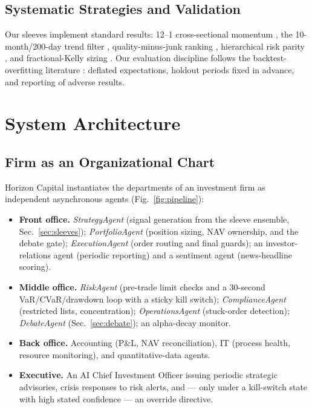 \documentclass[10pt,twocolumn]{IEEEtran}
\begin{document}
\subsection{Systematic Strategies and Validation}
Our sleeves implement standard results: 12--1 cross-sectional momentum
\cite{jegadeesh1993returns}, the 10-month/200-day trend filter
\cite{faber2007tactical}, quality-minus-junk ranking \cite{asness2019qmj},
hierarchical risk parity \cite{lopezdeprado2016hrp}, and fractional-Kelly
sizing \cite{kelly1956}. Our evaluation discipline follows the
backtest-overfitting literature \cite{bailey2014deflated,
lopezdeprado2018advances}: deflated expectations, holdout periods fixed in
advance, and reporting of adverse results.

\section{System Architecture}

\subsection{Firm as an Organizational Chart}

Horizon Capital instantiates the departments of an investment firm as
independent asynchronous agents (Fig.~\ref{fig:pipeline}):

\begin{itemize}
\item \textbf{Front office.} \emph{StrategyAgent} (signal generation from
the sleeve ensemble, Sec.~\ref{sec:sleeves}); \emph{PortfolioAgent}
(position sizing, NAV ownership, and the debate gate);
\emph{ExecutionAgent} (order routing and final guards); an investor-relations
agent (periodic reporting) and a sentiment agent (news-headline scoring).
\item \textbf{Middle office.} \emph{RiskAgent} (pre-trade limit checks and a
30-second VaR/CVaR/drawdown loop with a sticky kill switch);
\emph{ComplianceAgent} (restricted lists, concentration);
\emph{OperationsAgent} (stuck-order detection); \emph{DebateAgent}
(Sec.~\ref{sec:debate}); an alpha-decay monitor.
\item \textbf{Back office.} Accounting (P\&L, NAV reconciliation), IT
(process health, resource monitoring), and quantitative-data agents.
\item \textbf{Executive.} An AI Chief Investment Officer issuing periodic
strategic advisories, crisis responses to risk alerts, and --- only under a
kill-switch state with high stated confidence --- an override directive.
\end{itemize}
\end{document}
